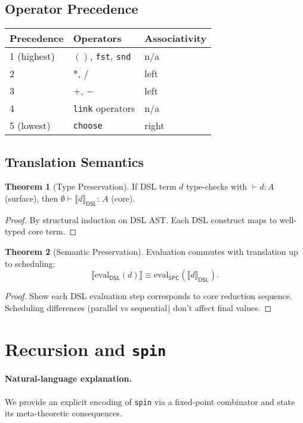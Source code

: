 \documentclass[12pt]{article}
\newcommand{\Entails}{\vdash}
\newcommand{\Types}{:\,}
\newcommand{\Interp}[1]{\llbracket #1 \rrbracket}
\theoremstyle{definition}
\newtheorem{theorem}{Theorem}
\begin{document}
\subsection{Operator Precedence}
\begin{tabular}{lll}
Precedence & Operators & Associativity \\
\hline
1 (highest) & $()$, \texttt{fst}, \texttt{snd} & n/a \\
2 & $*$, $/$ & left \\
3 & $+$, $-$ & left \\
4 & \texttt{link} operators & n/a \\
5 (lowest) & \texttt{choose} & right
\end{tabular}

\subsection{Translation Semantics}
\begin{theorem}[Type Preservation]
If DSL term $d$ type-checks with $\Entails d : A$ (surface),
then $\emptyset \Entails \Interp{d}_{\mathsf{DSL}} \Types A$ (core).
\end{theorem}
\begin{proof}
By structural induction on DSL AST. Each DSL construct maps to well-typed core term.
\end{proof}

\begin{theorem}[Semantic Preservation]
Evaluation commutes with translation up to scheduling:
$$\Interp{\text{eval}_{\mathsf{DSL}}(d)} \equiv \text{eval}_{\mathsf{SPC}}(\Interp{d}_{\mathsf{DSL}}).$$
\end{theorem}
\begin{proof}
Show each DSL evaluation step corresponds to core reduction sequence.
Scheduling differences (parallel vs sequential) don't affect final values.
\end{proof}

\section{Recursion and \texttt{spin}}\label{sec:fix}
\paragraph{Natural-language explanation.}
We provide an explicit encoding of \texttt{spin} via a fixed-point combinator and state its meta-theoretic consequences.
\end{document}
